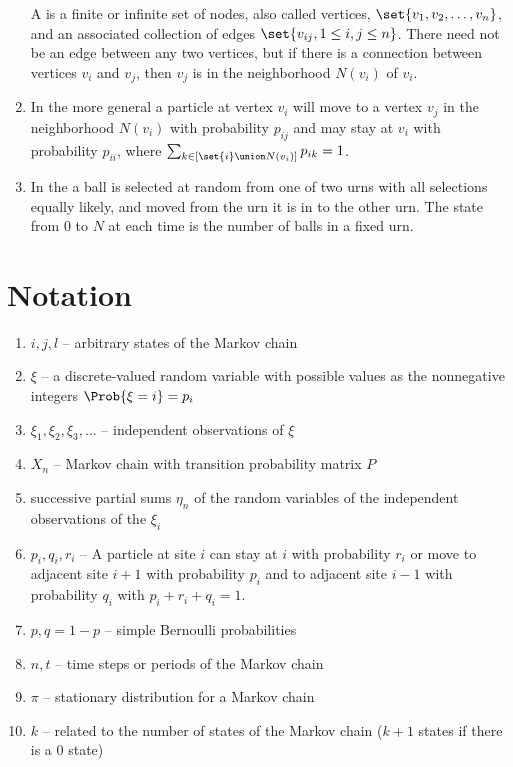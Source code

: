 \documentclass[12pt]{article}
\begin{document}
\begin{enumerate}
        A  is a finite or infinite set of nodes, also called
        vertices, \( \set{v_1, v_2, \dots, v_n} \), and an associated
        collection of edges \( \set{v_{ij}, 1 \le i,j \le n} \).  There
        need not be an edge between any two vertices, but if there is a
        connection between vertices \( v_i \) and \( v_j \), then \( v_j
        \) is in the neighborhood \( N(v_i) \) of \( v_i \).
    \item
        In the more general  a particle at
        vertex \( v_i \) will move to a vertex \( v_j \) in the
        neighborhood \( N(v_i) \) with probability \( p_{ij} \) and may
        stay at \( v_i \) with probability \( p_{ii} \), where \( \sum_
        {k \in [\set{i} \union N(v_i)]} p_{ik} = 1 \).
    \item
        In the  a ball is selected at random
        from one of two urns with all selections equally likely, and
        moved from the urn it is in to the other urn.  The state from \(
        0 \) to \( N \) at each time is the number of balls in a fixed
        urn.
\end{enumerate}

\hr

\section*{Notation}
\begin{enumerate}
    \item
        \( i, j, l \) -- arbitrary states of the Markov chain
    \item
        \( \xi \) -- a discrete-valued random variable with possible
        values as the nonnegative integers \( \Prob{\xi=i} = p_i \)
    \item
        \( \xi_1, \xi_2, \xi_3, \dots \) -- independent observations of \(
        \xi \)
    \item
        \( X_n \) -- Markov chain with transition probability matrix \(
        P \)
    \item
        successive partial sums \( \eta_n \) of the random variables of
        the independent observations of the \( \xi_i \)
    \item
        \( p_i, q_i, r_i \) -- A particle at site \( i \) can stay at \(
        i \) with probability \( r_i \) or move to adjacent site \( i+1 \)
        with probability \( p_i \) and to adjacent site \( i-1 \) with
        probability \( q_i \) with \( p_i+r_i+q_i = 1 \).
    \item
        \( p, q = 1-p \) -- simple Bernoulli probabilities
    \item
        \( n, t \) -- time steps or periods of the Markov chain
    \item
        \( \pi \) -- stationary distribution for a Markov chain
    \item
        \( k \) -- related to the number of states of the Markov chain (\(
        k + 1 \) states if there is a \( 0 \) state)
\end{enumerate}
\end{document}
